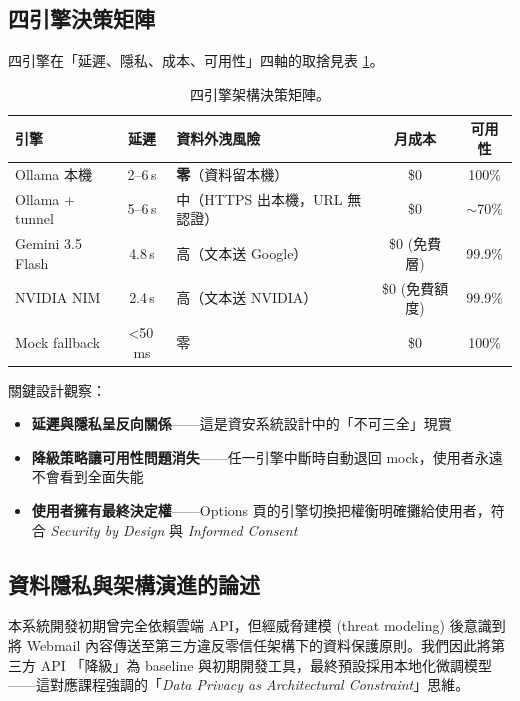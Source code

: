 \documentclass[11pt, a4paper]{article}
\begin{document}
\subsection{四引擎決策矩陣}
四引擎在「延遲、隱私、成本、可用性」四軸的取捨見表 \ref{tab:matrix}。

\begin{table}[h]
  \centering
  \small
  \begin{tabularx}{\textwidth}{lcXcc}
    \toprule
    \textbf{引擎} & \textbf{延遲} & \textbf{資料外洩風險} & \textbf{月成本} & \textbf{可用性} \\
    \midrule
    Ollama 本機      & 2--6\,s & \textbf{零}（資料留本機） & \$0 & 100\% \\
    Ollama + tunnel  & 5--6\,s & 中（HTTPS 出本機，URL 無認證） & \$0 & $\sim$70\% \\
    Gemini 3.5 Flash & 4.8\,s  & 高（文本送 Google） & \$0 (免費層) & 99.9\% \\
    NVIDIA NIM       & 2.4\,s  & 高（文本送 NVIDIA） & \$0 (免費額度) & 99.9\% \\
    Mock fallback    & \textless 50\,ms & 零 & \$0 & 100\% \\
    \bottomrule
  \end{tabularx}
  \caption{四引擎架構決策矩陣。}
  \label{tab:matrix}
\end{table}

關鍵設計觀察：
\begin{itemize}[leftmargin=2em]
  \item \textbf{延遲與隱私呈反向關係}——這是資安系統設計中的「不可三全」現實
  \item \textbf{降級策略讓可用性問題消失}——任一引擎中斷時自動退回 mock，使用者永遠不會看到全面失能
  \item \textbf{使用者擁有最終決定權}——Options 頁的引擎切換把權衡明確攤給使用者，符合 \textit{Security by Design} 與 \textit{Informed Consent}
\end{itemize}

\subsection{資料隱私與架構演進的論述}
本系統開發初期曾完全依賴雲端 API，但經威脅建模 (threat modeling) 後意識到將 Webmail 內容傳送至第三方違反零信任架構下的資料保護原則。我們因此將第三方 API 「降級」為 baseline 與初期開發工具，最終預設採用本地化微調模型——這對應課程強調的「\textit{Data Privacy as Architectural Constraint}」思維。

\end{document}
